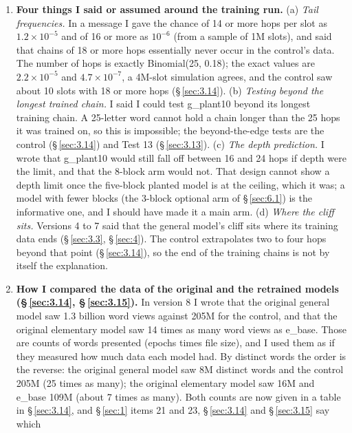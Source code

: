 \documentclass[paper=a4,fontsize=11pt,DIV=11,parskip=half,headings=small,numbers=noendperiod]{scrartcl}
\DeclareRobustCommand{\lead}[1]{\textsf{\bfseries\color{accent}#1}}
\DeclareRobustCommand{\code}[1]{{\fontseries{m}\ttfamily #1}}
\begin{document}
\begin{enumerate}
  word positions (72 to 83); the hop number grows with $L$ only because longer chains put more hops in the same
  positions.
\item \lead{Four things I said or assumed around the training run.} (a) \emph{Tail frequencies.} In a message I
  gave the chance of 14 or more hops per slot as $1.2\times10^{-5}$ and of 16 or more as $10^{-6}$ (from a
  sample of 1M slots), and said that chains of 18 or more hops essentially never occur in the control’s data.
  The number of hops is exactly Binomial(25, 0.18); the exact values are $2.2\times10^{-5}$ and
  $4.7\times10^{-7}$, a 4M-slot simulation agrees, and the control saw about 10 slots with 18 or more hops
  (\S\,\ref{sec:3.14}). (b) \emph{Testing beyond the longest trained chain.} I said I could test
  \code{g\_\allowbreak{}plant10} beyond its longest training chain. A 25-letter word cannot hold a chain longer
  than the 25 hops it was trained on, so this is impossible; the beyond-the-edge tests are the control
  (\S\,\ref{sec:3.14}) and Test 13 (\S\,\ref{sec:3.13}). (c) \emph{The depth prediction.} I wrote that
  \code{g\_\allowbreak{}plant10} would still fall off between 16 and 24 hops if depth were the limit, and that
  the 8-block arm would not. That design cannot show a depth limit once the five-block planted model is at the
  ceiling, which it was; a model with fewer blocks (the 3-block optional arm of \S\,\ref{sec:6.1}) is the
  informative one, and I should have made it a main arm. (d) \emph{Where the cliff sits.} Versions 4 to 7 said
  that the general model’s cliff sits where its training data ends (\S\,\ref{sec:3.3}, \S\,\ref{sec:4}). The
  control extrapolates two to four hops beyond that point (\S\,\ref{sec:3.14}), so the end of the training
  chains is not by itself the explanation.
\item \lead{How I compared the data of the original and the retrained models (\S\,\ref{sec:3.14},
  \S\,\ref{sec:3.15}).} In version 8 I wrote that the original general model saw 1.3 billion word views against
  205M for the control, and that the original elementary model saw 14 times as many word views as
  \code{e\_\allowbreak{}base}. Those are counts of words presented (epochs times file size), and I used them as
  if they measured how much data each model had. By distinct words the order is the reverse: the original
  general model saw 8M distinct words and the control 205M (25 times as many); the original elementary model saw
  16M and \code{e\_\allowbreak{}base} 109M (about 7 times as many). Both counts are now given in a table in
  \S\,\ref{sec:3.14}, and \S\,\ref{sec:1} items 21 and 23, \S\,\ref{sec:3.14} and \S\,\ref{sec:3.15} say which

\end{enumerate}
\end{document}
